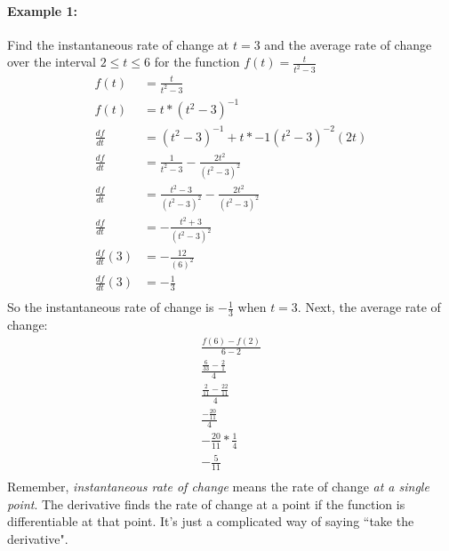 \documentclass[../revisedmain.tex]{subfiles}
\begin{document}
\paragraph{Example 1:}Find the instantaneous rate of change at $t=3$ and the average rate of change over the interval $2\le t\le6$ for the function $f(t)=\displaystyle\frac{t}{t^2-3}$\\
\begin{equation}
	\begin{split}
	f(t)&=\frac{t}{t^2-3}\\
	f(t)&=t*(t^2-3)^{-1}\\
	\frac{df}{dt}&=(t^2-3)^{-1}+t*-1(t^2-3)^{-2}(2t)\\
	\frac{df}{dt}&=\frac{1}{t^2-3}-\frac{2t^2}{(t^2-3)^2}\\
	\frac{df}{dt}&=\frac{t^2-3}{(t^2-3)^2}-\frac{2t^2}{(t^2-3)^2}\\
	\frac{df}{dt}&=-\frac{t^2+3}{(t^2-3)^2}\\
	\frac{df}{dt}(3)&=-\frac{12}{(6)^2}\\
	\frac{df}{dt}(3)&=-\frac{1}{3}\\
	\end{split}
\end{equation}So the instantaneous rate of change is $-\frac{1}{3}$ when $t=3$. Next, the average rate of change:
\begin{gather*}
\frac{f(6)-f(2)}{6-2}\\[.5em]
\frac{\displaystyle\frac{6}{33}-\displaystyle\frac{2}{1}}{4}\\[.5em]
\frac{\displaystyle\frac{2}{11}-\displaystyle\frac{22}{11}}{4}\\[.5em]
\frac{-\displaystyle\frac{20}{11}}{4}\\[.5em]
-\frac{20}{11}*\frac{1}{4}\\[.5em]
-\frac{5}{11}\\
\end{gather*}Remember, \textit{instantaneous rate of change} means the rate of change \textit{at a single point}. The derivative finds the rate of change at a point if the function is differentiable at that point. It's just a complicated way of saying ``take the derivative".
\end{document}
